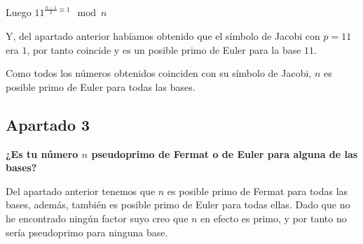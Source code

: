 \documentclass[a4paper]{article}
\begin{document}
Luego $11^{\frac{n-1}{2}\equiv 1}\mod n$

Y, del apartado anterior habíamos obtenido que el símbolo de Jacobi con $p=11$ era $1$, por tanto coincide y es un posible primo de Euler para la base $11$.

Como todos los números obtenidos coinciden con su símbolo de Jacobi, $n$ es posible primo de Euler para todas las bases.

\subsection{Apartado 3}

\textbf{¿Es tu número $n$ pseudoprimo de Fermat o de Euler para alguna de las bases?}

Del apartado anterior tenemos que $n$ es posible primo de Fermat para todas las bases, además, también es posible primo de Euler para todas ellas. Dado que no he encontrado ningún factor suyo creo que $n$ en efecto es primo, y por tanto no sería pseudoprimo para ninguna base.
\end{document}
